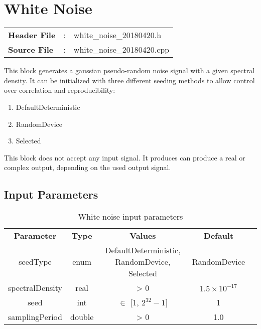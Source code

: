 \clearpage

\section{White Noise}

\begin{tcolorbox}	
	\begin{tabular}{p{2.75cm} p{0.2cm} p{10.5cm}} 	
		\textbf{Header File}   &:& white\_noise\_20180420.h \\
		\textbf{Source File}   &:& white\_noise\_20180420.cpp \\
	\end{tabular}
\end{tcolorbox}

\maketitle
This block generates a gaussian pseudo-random noise signal with a given spectral density. It can be initialized with three different seeding methods to allow control over correlation and reproducibility:

\begin{enumerate}
	\item DefaultDeterministic
	\item RandomDevice
	\item Selected
\end{enumerate}

This block does not accept any input signal. It produces can produce a real or complex output, depending on the used output signal.

\subsection*{Input Parameters}

\begin{table}[h]
	\centering
	\begin{tabular}{|c|c|c|c|c}
		\cline{1-4}
		\textbf{Parameter} & \textbf{Type} &\textbf{Values} &   \textbf{Default}& \\ \cline{1-4}
		seedType 		 & enum 	& DefaultDeterministic, RandomDevice, Selected & RandomDevice \\ \cline{1-4}
		spectralDensity  & real 	& > 0  			& $1.5\times10^{-17}$ \\ \cline{1-4}
		seed 	   		 & int 		& $\in$ [1, $2^{32}-1$] 	& 1 \\ \cline{1-4}
		samplingPeriod	 & double 	& > 0 & 1.0 \\ \cline{1-4} \cline{1-4}
	\end{tabular}
	\caption{White noise input parameters}
	\label{table:noise_in_par}
\end{table}

